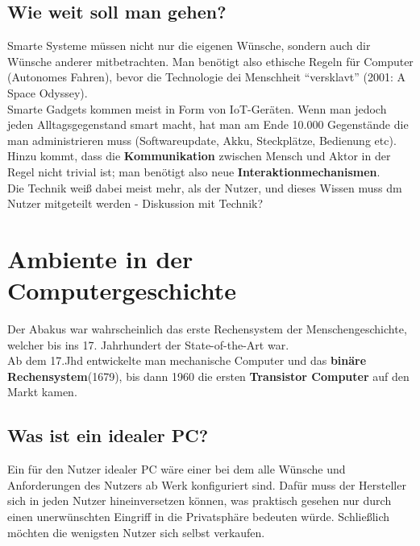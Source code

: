 \documentclass[a4paper]{article}
\begin{document}
\subsection{Wie weit soll man gehen?}
Smarte Systeme müssen nicht nur die eigenen Wünsche, sondern auch dir Wünsche anderer mitbetrachten. Man benötigt also ethische Regeln für Computer (Autonomes Fahren), bevor die Technologie dei Menschheit ``versklavt'' (2001: A Space Odyssey).\\

Smarte Gadgets kommen meist in Form von IoT-Geräten. Wenn man jedoch jeden Alltagsgegenstand smart macht, hat man am Ende 10.000 Gegenstände die man administrieren muss (Softwareupdate, Akku, Steckplätze, Bedienung etc). Hinzu kommt, dass die \textbf{Kommunikation} zwischen Mensch und Aktor in der Regel nicht trivial ist; man benötigt also neue \textbf{Interaktionmechanismen}.\\

 Die Technik weiß dabei meist mehr, als der Nutzer, und dieses Wissen muss dm Nutzer mitgeteilt werden - Diskussion mit Technik?

\newpage
\section{Ambiente in der Computergeschichte}
Der Abakus war wahrscheinlich das erste Rechensystem der Menschengeschichte, welcher bis ins 17. Jahrhundert der State-of-the-Art war.\\
Ab dem 17.Jhd entwickelte man mechanische Computer und das \textbf{binäre Rechensystem}(1679), bis dann 1960 die ersten \textbf{Transistor Computer} auf den Markt kamen.
\subsection{Was ist ein idealer PC?}
Ein für den Nutzer idealer PC wäre einer bei dem alle Wünsche und Anforderungen des Nutzers ab Werk konfiguriert sind. Dafür muss der Hersteller sich in jeden Nutzer hineinversetzen können, was praktisch gesehen nur durch einen unerwünschten Eingriff in die Privatsphäre bedeuten würde. Schließlich möchten die wenigsten Nutzer sich selbst verkaufen.
\end{document}
